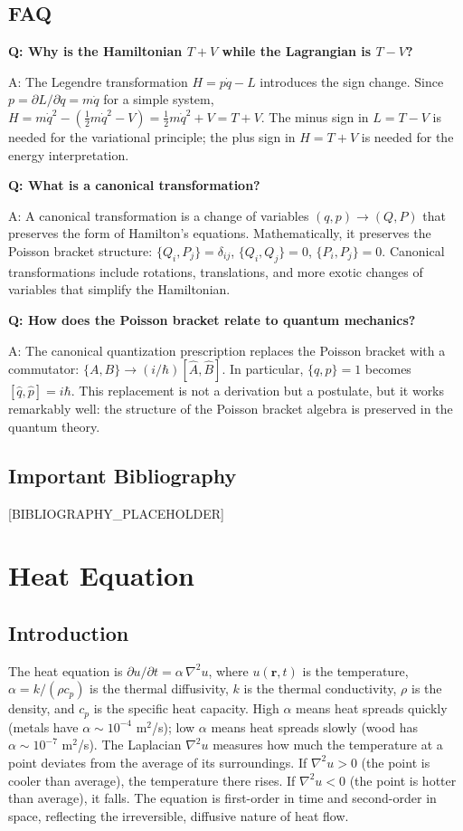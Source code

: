 \documentclass[11pt,openright]{book}
\begin{document}
\section*{FAQ}

\textbf{Q: Why is the Hamiltonian $T + V$ while the Lagrangian is $T - V$?}

A: The Legendre transformation $H = p\dot{q} - L$ introduces the sign change. Since $p = \partial L/\partial\dot{q} = m\dot{q}$ for a simple system, $H = m\dot{q}^2 - (\frac{1}{2}m\dot{q}^2 - V) = \frac{1}{2}m\dot{q}^2 + V = T + V$. The minus sign in $L = T - V$ is needed for the variational principle; the plus sign in $H = T + V$ is needed for the energy interpretation.

\textbf{Q: What is a canonical transformation?}

A: A canonical transformation is a change of variables $(q, p) \to (Q, P)$ that preserves the form of Hamilton's equations. Mathematically, it preserves the Poisson bracket structure: $\{Q_i, P_j\} = \delta_{ij}$, $\{Q_i, Q_j\} = 0$, $\{P_i, P_j\} = 0$. Canonical transformations include rotations, translations, and more exotic changes of variables that simplify the Hamiltonian.

\textbf{Q: How does the Poisson bracket relate to quantum mechanics?}

A: The canonical quantization prescription replaces the Poisson bracket with a commutator: $\{A, B\} \to (i/\hbar)[\hat{A}, \hat{B}]$. In particular, $\{q, p\} = 1$ becomes $[\hat{q}, \hat{p}] = i\hbar$. This replacement is not a derivation but a postulate, but it works remarkably well: the structure of the Poisson bracket algebra is preserved in the quantum theory.
\section*{Important Bibliography}

[BIBLIOGRAPHY_PLACEHOLDER]


\chapter{Heat Equation}

\section*{Introduction}

The heat equation is $\partial u/\partial t = \alpha\,\nabla^2 u$, where $u(\mathbf{r}, t)$ is the temperature, $\alpha = k/(\rho c_p)$ is the thermal diffusivity, $k$ is the thermal conductivity, $\rho$ is the density, and $c_p$ is the specific heat capacity. High $\alpha$ means heat spreads quickly (metals have $\alpha \sim 10^{-4}$ m$^2$/s); low $\alpha$ means heat spreads slowly (wood has $\alpha \sim 10^{-7}$ m$^2$/s). The Laplacian $\nabla^2 u$ measures how much the temperature at a point deviates from the average of its surroundings. If $\nabla^2 u > 0$ (the point is cooler than average), the temperature there rises. If $\nabla^2 u < 0$ (the point is hotter than average), it falls. The equation is first-order in time and second-order in space, reflecting the irreversible, diffusive nature of heat flow.
\end{document}
